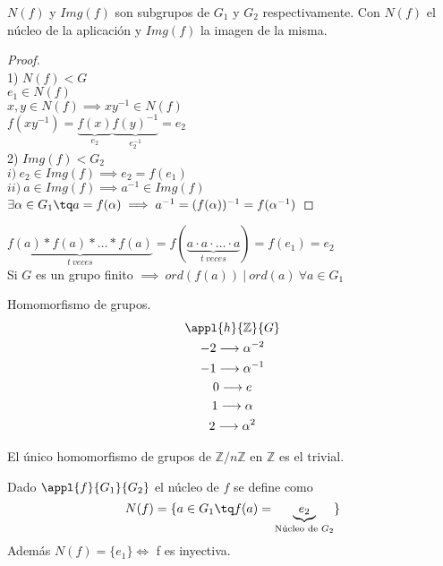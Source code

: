 \documentclass[a4paper,10pt]{apuntes}
\begin{document}
 \begin{theorem}
 $N(f)$ y $Img(f)$ son subgrupos de $G_1$ y $G_2$ respectivamente.
 Con $N(f)$ el núcleo de la aplicación y $Img(f)$ la imagen de la misma.
 \end{theorem}
 \begin{proof}\\
 1) $N(f) < G$\\
 $e_1 \in N(f)$\\ $x, y \in N(f) \implies xy^{-1}\in N(f)$\\
 $f(xy^{-1}) = \underbrace{f(x)}_{e_2} \underbrace{f(y)^{-1}}_{e_2^{-1}} = e_2$\\
 2) $Img(f) < G_2$\\
 $i)\ e_2\in Img(f) \implies e_2 = f(e_1)$\\
 $ii)\ a\in Img(f) \implies a^{-1}\in Img(f)$\\
 $\exists \alpha \in G_1 \tq a=f(\alpha ) \implies a^{-1} = (f(\alpha ))^{-1} = f(\alpha ^{-1})$
 \end{proof}

\obs $\underbrace{f(a) \ast f(a) \ast \hdots \ast f(a)}_{t\ veces} = f(\underbrace{a \cdot a \cdot \hdots \cdot a}_{t\ veces}) = f(e_1) = e_2$\\ Si $G$ es un grupo finito $\implies\ ord(f(a))\ |\ ord(a)\ \forall a \in G_1$

\begin{example} Homomorfismo de grupos.\\
\begin{gather*}
\appl{h}{\mathbb{Z}}{G}\\
-2 \longrightarrow \alpha ^{-2}\\
-1 \longrightarrow \alpha ^{-1}\\
0 \longrightarrow e\\
1 \longrightarrow \alpha\\
2 \longrightarrow \alpha ^{2}\\
\end{gather*}
\end{example}

\obs El único homomorfismo de grupos de $\mathbb{Z}/n\mathbb{Z}$ en $\mathbb{Z}$ es el trivial.\\

\begin{defn}[Núcleo]
Dado $\appl{f}{G_1}{G_2}$ el núcleo de $f$ se define como\\
$$N(f) = \{ a\in G_1 \tq f(a) = \underbrace{e_2}_{\text{Núcleo de } G_2}\} $$
Además $N(f) = \{ e_1 \} \iff$ f es inyectiva.
\end{defn}
\end{document}
